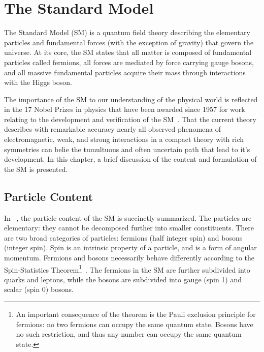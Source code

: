 \chapter{The Standard Model}
\label{ch:stdmodel}



The Standard Model (SM) is a quantum field theory describing the elementary particles and fundamental forces (with the exception of gravity)
that govern the universe. At its core, the SM states that all matter is composed of fundamental particles called fermions, all forces are mediated by force carrying gauge bosons, and all massive fundamental particles acquire their mass through interactions with the Higgs boson.

The importance of the SM to our understanding of the physical world is reflected in the 17 Nobel Prizes in physics that have been awarded since 1957 for work relating to the development and verification of the SM~\cite{Nobel_Prizes}. That the current theory describes with remarkable accuracy nearly all observed phenomena of electromagnetic, weak, and strong interactions in a compact theory with rich symmetries can belie the tumultuous and often uncertain path that lead to it's development. In this chapter, a brief discussion of the content and formulation of the SM is presented. 

%
\section{Particle Content}

In ~\Fig{\ref{fig:st_m_p}}, the particle content of the SM is succinctly summarized. The particles are elementary: they cannot be decomposed further into smaller constituents. There are two broad categories of particles: fermions (half integer spin) and bosons (integer spin). Spin is an intrinsic property of a particle, and is a form of angular momentum. Fermions and bosons necessarily behave differently according to the Spin-Statistics Theorem\footnote{
	An important consequence of the theorem is the Pauli exclusion principle for fermions: no two fermions can occupy the same quantum state. Bosons have no such restriction, and thus any number can occupy the same quantum state.
}~\cite{spin_stats}. The fermions in the SM are further subdivided into quarks and leptons, while the bosons are subdivided into gauge (spin 1) and scalar (spin 0) bosons. 

